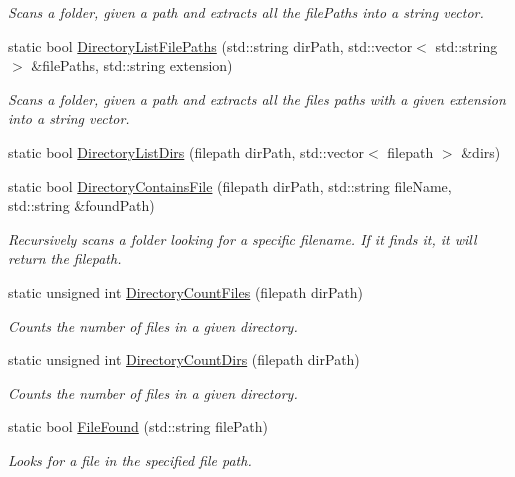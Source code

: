 \begin{DoxyCompactItemize}
\begin{DoxyCompactList}\small\item\em Scans a folder, given a path and extracts all the file\-Paths into a string vector. \end{DoxyCompactList}\item 
static bool \hyperlink{classDCEngine_1_1FileSystem_a4332cd751b54b3645835f5f01e037bf0}{Directory\-List\-File\-Paths} (std\-::string dir\-Path, std\-::vector$<$ std\-::string $>$ \&file\-Paths, std\-::string extension)
\begin{DoxyCompactList}\small\item\em Scans a folder, given a path and extracts all the files paths with a given extension into a string vector. \end{DoxyCompactList}\item 
static bool \hyperlink{classDCEngine_1_1FileSystem_a95ecb139e8779257c64162c3b553089a}{Directory\-List\-Dirs} (filepath dir\-Path, std\-::vector$<$ filepath $>$ \&dirs)
\item 
static bool \hyperlink{classDCEngine_1_1FileSystem_af72751722d81ba4ffe67ac6c73127bee}{Directory\-Contains\-File} (filepath dir\-Path, std\-::string file\-Name, std\-::string \&found\-Path)
\begin{DoxyCompactList}\small\item\em Recursively scans a folder looking for a specific filename. If it finds it, it will return the filepath. \end{DoxyCompactList}\item 
static unsigned int \hyperlink{classDCEngine_1_1FileSystem_a0ac0fa3a992625285807bb9b3fa3f18a}{Directory\-Count\-Files} (filepath dir\-Path)
\begin{DoxyCompactList}\small\item\em Counts the number of files in a given directory. \end{DoxyCompactList}\item 
static unsigned int \hyperlink{classDCEngine_1_1FileSystem_abf526a64be0232c378cc6b47724fcaba}{Directory\-Count\-Dirs} (filepath dir\-Path)
\begin{DoxyCompactList}\small\item\em Counts the number of files in a given directory. \end{DoxyCompactList}\item 
static bool \hyperlink{classDCEngine_1_1FileSystem_af26e7adc1b151c8a3e021f0f9212109f}{File\-Found} (std\-::string file\-Path)
\begin{DoxyCompactList}\small\item\em Looks for a file in the specified file path. \end{DoxyCompactList}\item 

\end{DoxyCompactItemize}
